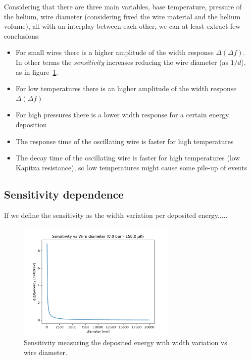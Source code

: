 \documentclass[a4paper,12pt]{article}
\begin{document}
Considering that there are three main variables, base temperature, pressure of the helium, wire diameter (considering fixed the wire material and the helium volume), all with an interplay between each other, we can at least extract few conclusions:
\begin{itemize}
  \item For small wires there is a higher amplitude of the width response $\Delta (\Delta f)$. In other terms the \textit{sensitivity} increases reducing the wire diameter (as $1/d$), as in figure~\ref{fig:SensitivityVsDiameter}.
  \item For low temperatures there is an higher amplitude of the width response $\Delta (\Delta f)$
  \item For high pressures there is a lower width response for a certain energy deposition
  \item The response time of the oscillating wire is faster for high temperatures 
  \item The decay time of the oscillating wire is faster for high temperatures (low Kapitza resistance), so low temperatures might cause some pile-up of events
\end{itemize}

\subsection{Sensitivity dependence}

If we define the sensitivity as the width variation per deposited energy.....

\begin{figure}[!ht]
  \begin{center}
    \includegraphics[width=0.69\textwidth]{Sensitivity_vs_diameter-0bar}
    \caption{Sensitivity measuring the deposited energy with width variation vs wire diameter.}
    \label{fig:SensitivityVsDiameter}
  \end{center}
\end{figure}
\end{document}
